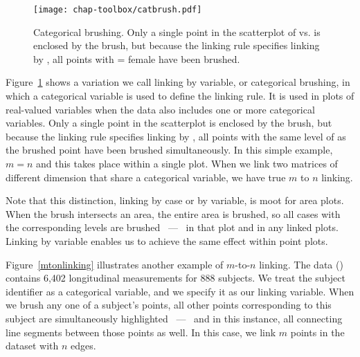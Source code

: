
\begin{figure}[htp]
\centerline{\texttt{[image: chap-toolbox/catbrush.pdf]}}
\caption[Categorical brushing]{Categorical brushing.  Only a single
point in the scatterplot of  vs.  is
enclosed by the brush, but because the linking rule specifies linking
by , all points with  = female have been brushed.}
\label{catbrush}
\end{figure}

Figure~\ref{catbrush} shows a variation we call linking by variable,
or categorical brushing,  in which a
categorical variable is used to define the linking rule.  It is used
in plots of real-valued variables when the data also includes one or
more categorical variables.  Only a single point in the scatterplot is
enclosed by the brush, but because the linking rule specifies linking
by , all points with the same level of  as the
brushed point have been brushed simultaneously.  In this simple
example, $m=n$ and this takes place within a single plot.  When we
link two matrices of different dimension that share a categorical
variable, we have true $m$ to $n$ linking.


Note that this distinction, linking by case or by variable, is moot
for area plots.  When the brush intersects an area, the entire area is
brushed, so all cases with the corresponding levels are brushed ~---~
in that plot and in any linked plots.  Linking by variable enables us
to achieve the same effect within point plots.

Figure~\ref{mtonlinking} illustrates another example of $m$-to-$n$
linking.  The data () contains 6,402 longitudinal
measurements for 888 subjects.  We treat the subject identifier as a
categorical variable, and we specify it as our linking variable.
When we brush any one of a subject's points, all other points
corresponding to this subject are simultaneously highlighted ~---~ and
in this instance, all connecting line segments between those points
as well.  In this case, we link $m$ points in the dataset with $n$
edges.


